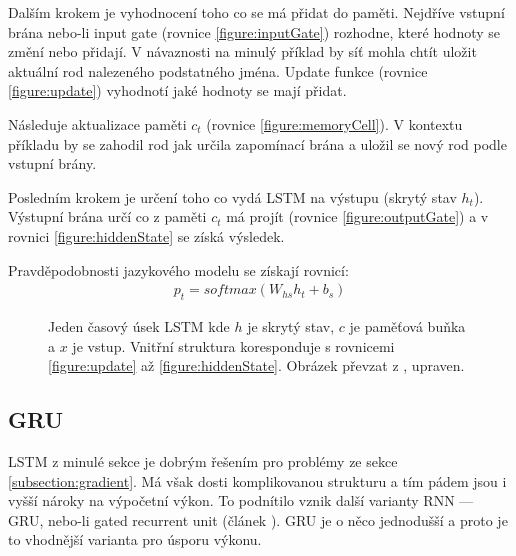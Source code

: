 Dalším krokem je vyhodnocení toho co se má přidat do paměti. Nejdříve vstupní brána nebo-li input gate (rovnice \ref{figure:inputGate}) rozhodne, které hodnoty se změní nebo přidají. V návaznosti na minulý příklad by síť mohla chtít uložit aktuální rod nalezeného podstatného jména. Update funkce (rovnice \ref{figure:update}) vyhodnotí jaké hodnoty se mají přidat.

Následuje aktualizace paměti $c_t$ (rovnice \ref{figure:memoryCell}). V kontextu příkladu by se zahodil rod jak určila zapomínací brána a uložil se nový rod podle vstupní brány.

Posledním krokem je určení toho co vydá LSTM na výstupu (skrytý stav $h_t$). Výstupní brána určí co z paměti $c_t$ má projít (rovnice \ref{figure:outputGate}) a v rovnici \ref{figure:hiddenState} se získá výsledek.

Pravděpodobnosti jazykového modelu se získají rovnicí:
\begin{align}
    p_t = softmax(W_{hs}h_{t} + b_{s})
\end{align}


\begin{figure}[H]
    \begin{center}
    \end{center}
	\caption{Jeden časový úsek LSTM kde $h$ je skrytý stav, $c$ je paměťová buňka a $x$ je vstup. Vnitřní struktura koresponduje s rovnicemi \ref{figure:update} až \ref{figure:hiddenState}. Obrázek převzat z \cite{understandingLSTM}, upraven.}
	\label{img:LSTM}
\end{figure}



\subsection{GRU}\label{section:GRU}
LSTM z minulé sekce je dobrým řešením pro problémy ze sekce \ref{subsection:gradient}. Má však dosti komplikovanou strukturu a tím pádem jsou i vyšší nároky na výpočetní výkon. To podnítilo vznik další varianty RNN --- GRU, nebo-li gated recurrent unit (článek \cite{GRU}). GRU je o něco jednodušší a proto je to vhodnější varianta pro úsporu výkonu.

